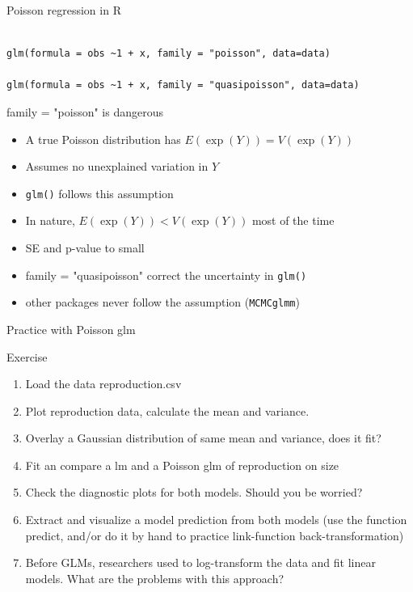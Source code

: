 \documentclass{beamer}
\makeatletter
\newenvironment{kframe}{%
 \def\at@end@of@kframe{}%
 \ifinner\ifhmode%
  \def\at@end@of@kframe{\end{minipage}}%
  \begin{minipage}{\columnwidth}%
 \fi\fi%
 \def\FrameCommand##1{\hskip\@totalleftmargin \hskip-\fboxsep
 \colorbox{shadecolor}{##1}\hskip-\fboxsep
     \hskip-\linewidth \hskip-\@totalleftmargin \hskip\columnwidth}%
 \MakeFramed {\advance\hsize-\width
   \@totalleftmargin\z@ \linewidth\hsize
   \@setminipage}}%
 {\par\unskip\endMakeFramed%
 \at@end@of@kframe}
\newenvironment{knitrout}{}{} %
\makeatother
\begin{document}
  
\begin{frame}[fragile]{Poisson regression in R}
    
\begin{knitrout}
\color{fgcolor}\begin{kframe}
\begin{verbatim}

glm(formula = obs ~1 + x, family = "poisson", data=data)

glm(formula = obs ~1 + x, family = "quasipoisson", data=data)
\end{verbatim}
\end{kframe}
\end{knitrout}

\begin{alertblock}{family = "poisson" is dangerous}
 \begin{itemize}
  \item A true Poisson distribution has $E(\exp(Y))=V(\exp(Y))$
  \item Assumes no unexplained variation in $Y$
  \item \texttt{glm()} follows this assumption
  \item In nature,  $E(\exp(Y)) < V(\exp(Y))$ most of the time
  \item SE and p-value to small
  \item family = "quasipoisson" correct the uncertainty in \texttt{glm()}
  \item other packages never follow the assumption (\texttt{MCMCglmm})
 \end{itemize}
\end{alertblock}

\end{frame}

\begin{frame}{Practice with Poisson glm}
 
  \begin{exampleblock}{Exercise}
    \begin{enumerate}
      \item Load the data reproduction.csv
      \item Plot reproduction data, calculate the mean and variance. 
      \item Overlay a Gaussian distribution of same mean and variance, does it fit?
      \item Fit an compare a lm and a Poisson glm of reproduction on size 
      \item Check the diagnostic plots for both models. Should you be worried?
      \item Extract and visualize a model prediction from both models (use the function predict, and/or do it by hand to practice link-function back-transformation)
      \item Before GLMs, researchers used to log-transform the data and fit linear models. What are the problems with this approach?
    \end{enumerate}
  \end{exampleblock}
\end{frame}
\end{document}
